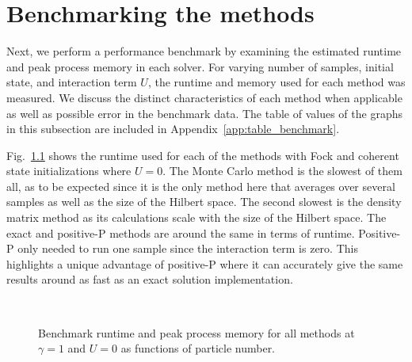 \chapter{Benchmarking the methods}
\hspace{\parindent}Next, we perform a performance benchmark by examining the estimated runtime and peak process memory in each solver. For varying number of samples, initial state, and interaction term $U$, the runtime and memory used for each method was measured. We discuss the distinct characteristics of each method when applicable as well as possible error in the benchmark data. The table of values of the graphs in this subsection are included in Appendix~\ref{app:table_benchmark}.


\hspace{\parindent} Fig.~\ref{fig:benchmarkGamma1U0} shows the runtime used for each of the methods with Fock and coherent state initializations where $U=0$. The Monte Carlo method is the slowest of them all, as to be expected since it is the only method here that averages over several samples as well as the size of the Hilbert space. The second slowest is the density matrix method as its calculations scale with the size of the Hilbert space. The exact and positive-P methods are around the same in terms of runtime. Positive-P only needed to run one sample since the interaction term is zero. This highlights a unique advantage of positive-P where it can accurately give the same results around as fast as an exact solution implementation.

\begin{figure}[h]
  \centering
  \\
  \caption{
  Benchmark runtime and peak process memory for all methods at $\gamma=1$ and $U=0$ as functions of particle number. 
  }
  \label{fig:benchmarkGamma1U0}
\end{figure}

